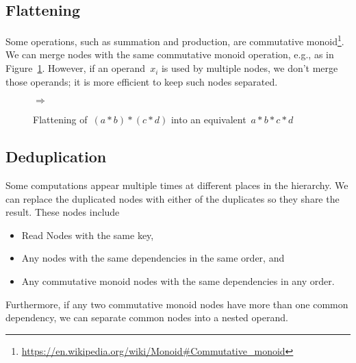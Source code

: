 \documentclass{article}
\begin{document}
\subsection{Flattening}

Some operations, such as summation and production, are commutative monoid\footnote{
	\url{https://en.wikipedia.org/wiki/Monoid\#Commutative_monoid}
}.
We can merge nodes with the same commutative monoid operation, e.g., as in Figure~\ref{fig:optimization:flatten-example}.
However, if an operand~$x_i$ is used by multiple nodes, we don't merge those operands; it is more efficient to keep such nodes separated.
%
\begin{figure}
	\centering
	\quad$\Rightarrow$\quad
	\caption{Flattening of~$(a * b) * (c * d)$ into an equivalent~$a * b * c * d$}
	\label{fig:optimization:flatten-example}
\end{figure}

\subsection{Deduplication}

Some computations appear multiple times at different places in the hierarchy.
We can replace the duplicated nodes with either of the duplicates so they  share the result.
These nodes include
%
\begin{itemize}
	\item Read Nodes with the same key,
	\item Any nodes with the same dependencies in the same order, and
	\item Any commutative monoid nodes with the same dependencies in any order.
\end{itemize}
%
Furthermore, if any two commutative monoid nodes have more than one common dependency, we can separate common nodes into a nested operand.
\end{document}
